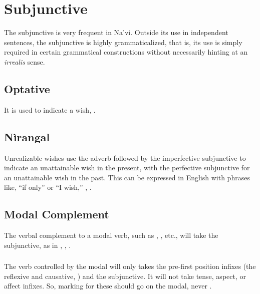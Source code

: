 \section{Subjunctive}
\noindent The subjunctive is very frequent in Na'vi.  Outside its use in
independent sentences, the sub\-junct\-ive is highly grammaticalized, that
is, its use is simply required in certain grammatical constructions
without necessarily hinting at an \textit{irrealis} sense.

\subsection{Optative} It is used to indicate a wish,  .

\subsection{Nìrangal} Unrealizable wishes use the adverb 
followed by the imperfective subjunctive to indicate an unattainable
wish in the present, with the perfective subjunctive for an
unattainable wish in the past.  This can be expressed in English with
phrases like, ``if only'' or ``I wish,''  ,
 .

\subsection{Modal Complement} 
The verbal complement to a modal verb, such as  ,
 , etc., will take the subjunctive, as in  ,  ,  . \label{syn:modals}


\subsubsection{} \label{syn:modal-syntax} The verb controlled by the
modal will only takes the pre-first position infixes (the reflexive
and causative, ) and the subjunctive.  It
will not take tense, aspect, or affect infixes.  So, marking for these
should go on the modal,  
never . 

